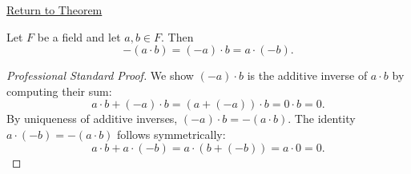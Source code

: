 \newpage
{}
\label{prf:negation-of-product}

\begin{remark*}[Return]
\hyperref[thm:negation-of-product]{Return to Theorem}
\end{remark*}

\begin{theorem*}
Let $F$ be a field and let $a,b\in F$.  Then
\[
-(a\cdot b) = (-a)\cdot b = a\cdot(-b).
\]
\end{theorem*}

\begin{proof}[Professional Standard Proof]
\LRAProofBodyStart
We show $(-a)\cdot b$ is the additive inverse of $a\cdot b$ by computing
their sum:
\[
a\cdot b + (-a)\cdot b = (a + (-a))\cdot b = 0\cdot b = 0.
\]
By uniqueness of additive inverses, $(-a)\cdot b = -(a\cdot b)$.
The identity $a\cdot(-b) = -(a\cdot b)$ follows symmetrically:
\[
a\cdot b + a\cdot(-b) = a\cdot(b + (-b)) = a\cdot 0 = 0.
\]
\end{proof}

